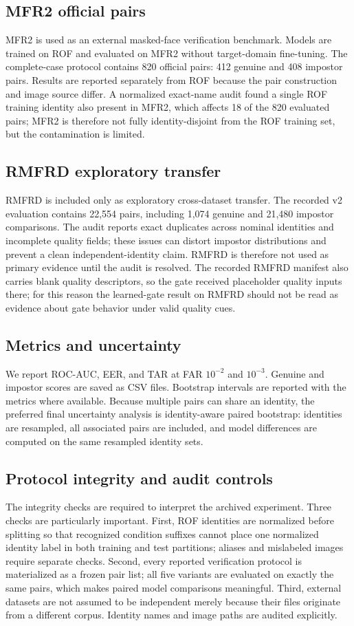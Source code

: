 \documentclass[10pt,journal,compsoc]{IEEEtran}
\begin{document}
\subsection{MFR2 official pairs}
MFR2 is used as an external masked-face verification benchmark. Models are trained on ROF and evaluated on MFR2 without target-domain fine-tuning. The complete-case protocol contains 820 official pairs: 412 genuine and 408 impostor pairs. Results are reported separately from ROF because the pair construction and image source differ. A normalized exact-name audit found a single ROF training identity also present in MFR2, which affects 18 of the 820 evaluated pairs; MFR2 is therefore not fully identity-disjoint from the ROF training set, but the contamination is limited. 

\subsection{RMFRD exploratory transfer}
RMFRD is included only as exploratory cross-dataset transfer. The recorded v2 evaluation contains 22,554 pairs, including 1,074 genuine and 21,480 impostor comparisons. The audit reports exact duplicates across nominal identities and incomplete quality fields; these issues can distort impostor distributions and prevent a clean independent-identity claim. RMFRD is therefore not used as primary evidence until the audit is resolved. The recorded RMFRD manifest also carries blank quality descriptors, so the gate received placeholder quality inputs there; for this reason the learned-gate result on RMFRD should not be read as evidence about gate behavior under valid quality cues.

\subsection{Metrics and uncertainty}
We report ROC-AUC, EER, and TAR at FAR $10^{-2}$ and $10^{-3}$. Genuine and impostor scores are saved as CSV files. Bootstrap intervals are reported with the metrics where available. Because multiple pairs can share an identity, the preferred final uncertainty analysis is identity-aware paired bootstrap: identities are resampled, all associated pairs are included, and model differences are computed on the same resampled identity sets.

\subsection{Protocol integrity and audit controls}
The integrity checks are required to interpret the archived experiment. Three checks are particularly important. First, ROF identities are normalized before splitting so that recognized condition suffixes cannot place one normalized identity label in both training and test partitions; aliases and mislabeled images require separate checks. Second, every reported verification protocol is materialized as a frozen pair list; all five variants are evaluated on exactly the same pairs, which makes paired model comparisons meaningful. Third, external datasets are not assumed to be independent merely because their files originate from a different corpus. Identity names and image paths are audited explicitly.
\end{document}

